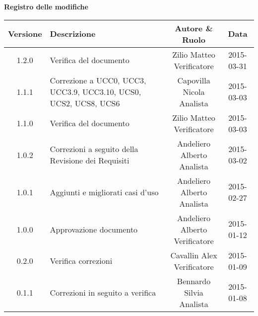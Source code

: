 \begin{center}
\Large{\textbf{Registro delle modifiche}}
\\\vspace{0.5cm}
\normalsize
\begin{tabularx}{\textwidth}{cXcc}
\textbf{Versione} & \textbf{Descrizione} & \textbf{Autore \& Ruolo} & \textbf{Data} \\
\toprule

1.2.0 & Verifica del documento & \multicell{Zilio Matteo \\ Verificatore} & 2015-03-31 \\\midrule
1.1.1 & Correzione a UCC0, UCC3, UCC3.9, UCC3.10, UCS0, UCS2, UCS8, UCS6 & \multicell{Capovilla Nicola \\ Analista} & 2015-03-03 \\\midrule
1.1.0 & Verifica del documento & \multicell{Zilio Matteo \\ Verificatore} & 2015-03-03 \\\midrule
1.0.2 & Correzioni a seguito della Revisione dei Requisiti & \multicell{Andeliero Alberto \\ Analista} & 2015-03-02  \\\midrule
1.0.1 & Aggiunti e migliorati casi d'uso & \multicell{Andeliero Alberto \\ Analista} &  2015-02-27 \\\midrule
1.0.0 & Approvazione documento & \multicell{Andeliero Alberto \\ Verificatore} & 2015-01-12  \\\midrule
0.2.0 & Verifica correzioni & \multicell{Cavallin Alex \\ Verificatore} & 2015-01-09\\\midrule
0.1.1 & Correzioni in seguito a verifica & \multicell{Bennardo Silvia \\ Analista} & 2015-01-08 \\\midrule

\end{tabularx}
\end{center}
